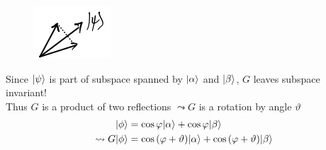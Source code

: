 \begin{figure}[H]
    \centering
    \includegraphics[scale=0.5]{chapters/res/psi-reflection-diagram.png}
\end{figure}

Since $\lvert\psi\rangle$ is part of subspace spanned by $\lvert\alpha\rangle$ and $\lvert\beta\rangle$, 
$G$ leaves subspace invariant! \\
Thus $G$ is a product of two reflections $\leadsto G$ is a rotation by angle 
$\vartheta$
\begin{align}
    \lvert\phi\rangle &= \cos{\varphi} \lvert\alpha\rangle + \cos{\varphi} \lvert\beta\rangle \\
    \leadsto G \lvert\phi\rangle &= \cos{(\varphi + \vartheta)} \lvert\alpha\rangle + \cos{(\varphi + \vartheta)} \lvert\beta\rangle
\end{align}